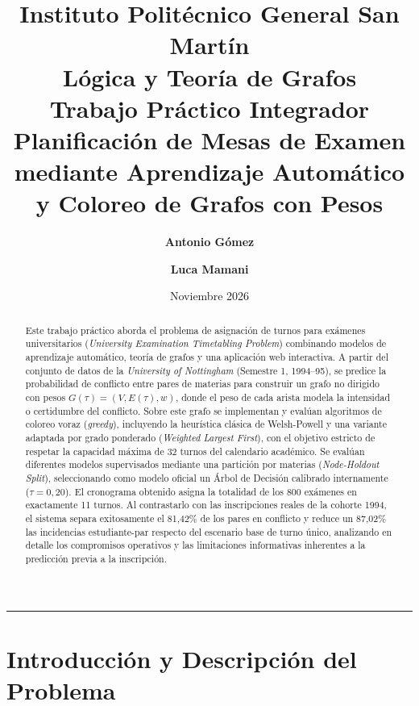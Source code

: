 \documentclass[11pt,a4paper]{article}
\title{
    \vspace{-1.0cm}
    \textbf{\Large Instituto Politécnico General San Martín }\\
    \vspace{0.2cm}
    \textbf{\large Lógica y Teoría de Grafos}\\
    \vspace{0.4cm}
    \textbf{\LARGE Trabajo Práctico Integrador}\\
    \vspace{0.3cm}
    \textbf{\LARGE Planificación de Mesas de Examen mediante Aprendizaje Automático y Coloreo de Grafos con Pesos}
}
\author{
    \textbf{Antonio Gómez} \and \textbf{Luca Mamani}
}
\date{Noviembre 2026}
\begin{document}
\maketitle

\begin{abstract}
Este trabajo práctico aborda el problema de asignación de turnos para exámenes universitarios (\textit{University Examination Timetabling Problem}) combinando modelos de aprendizaje automático, teoría de grafos y una aplicación web interactiva. A partir del conjunto de datos de la \textit{University of Nottingham} (Semestre 1, 1994--95), se predice la probabilidad de conflicto entre pares de materias para construir un grafo no dirigido con pesos $G(\tau) = (V, E(\tau), w)$, donde el peso de cada arista modela la intensidad o certidumbre del conflicto. Sobre este grafo se implementan y evalúan algoritmos de coloreo voraz (\textit{greedy}), incluyendo la heurística clásica de Welsh-Powell y una variante adaptada por grado ponderado (\textit{Weighted Largest First}), con el objetivo estricto de respetar la capacidad máxima de 32 turnos del calendario académico. Se evalúan diferentes modelos supervisados mediante una partición por materias (\textit{Node-Holdout Split}), seleccionando como modelo oficial un Árbol de Decisión calibrado internamente ($\tau = 0,20$). El cronograma obtenido asigna la totalidad de los 800 exámenes en exactamente 11 turnos. Al contrastarlo con las inscripciones reales de la cohorte 1994, el sistema separa exitosamente el 81,42\% de los pares en conflicto y reduce un 87,02\% las incidencias estudiante-par respecto del escenario base de turno único, analizando en detalle los compromisos operativos y las limitaciones informativas inherentes a la predicción previa a la inscripción.
\end{abstract}

\vspace{0.3cm}
\tableofcontents
\vspace{0.5cm}
\hrule
\vspace{0.5cm}

\section{Introducción y Descripción del Problema}
\end{document}
